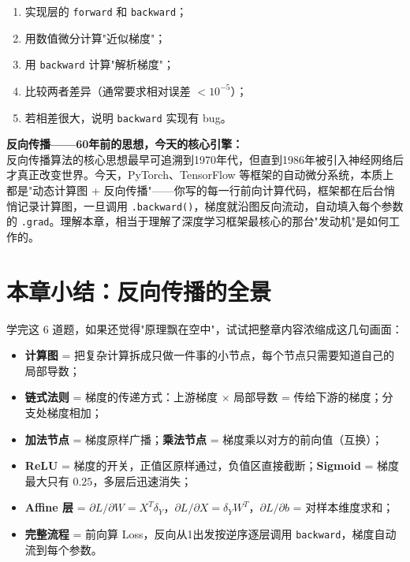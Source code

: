 \documentclass[a4paper,11pt]{ctexart}
\begin{document}
\begin{solutionbox}[参考答案与详细解析]
    \begin{keybox}[梯度检验的工作流程]
        \begin{enumerate}[(1)]
            \item 实现层的 \texttt{forward} 和 \texttt{backward}；
            \item 用数值微分计算"近似梯度"；
            \item 用 \texttt{backward} 计算"解析梯度"；
            \item 比较两者差异（通常要求相对误差 $< 10^{-5}$）；
            \item 若相差很大，说明 \texttt{backward} 实现有 bug。
        \end{enumerate}
    \end{keybox}
\end{solutionbox}

\begin{appbox}[现实应用场景]
    \textbf{反向传播——60年前的思想，今天的核心引擎：}\\
    反向传播算法的核心思想最早可追溯到1970年代，但直到1986年被引入神经网络后才真正改变世界。今天，PyTorch、TensorFlow 等框架的自动微分系统，本质上都是"动态计算图 + 反向传播"——你写的每一行前向计算代码，框架都在后台悄悄记录计算图，一旦调用 \texttt{.backward()}，梯度就沿图反向流动，自动填入每个参数的 \texttt{.grad}。理解本章，相当于理解了深度学习框架最核心的那台"发动机"是如何工作的。
\end{appbox}

\section{本章小结：反向传播的全景}

学完这 6 道题，如果还觉得"原理飘在空中"，试试把整章内容浓缩成这几句画面：

\begin{itemize}
    \item \textbf{计算图} = 把复杂计算拆成只做一件事的小节点，每个节点只需要知道自己的局部导数；
    \item \textbf{链式法则} = 梯度的传递方式：上游梯度 $\times$ 局部导数 = 传给下游的梯度；分支处梯度相加；
    \item \textbf{加法节点} = 梯度原样广播；\textbf{乘法节点} = 梯度乘以对方的前向值（互换）；
    \item \textbf{ReLU} = 梯度的开关，正值区原样通过，负值区直接截断；\textbf{Sigmoid} = 梯度最大只有 $0.25$，多层后迅速消失；
    \item \textbf{Affine 层} = $\partial L/\partial W = X^T\delta_Y$，$\partial L/\partial X = \delta_Y W^T$，$\partial L/\partial b$ = 对样本维度求和；
    \item \textbf{完整流程} = 前向算 Loss，反向从1出发按逆序逐层调用 \texttt{backward}，梯度自动流到每个参数。
\end{itemize}
\end{document}
